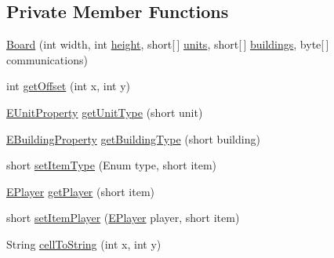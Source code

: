 \subsection*{Private Member Functions}
\begin{DoxyCompactItemize}
\item 
\mbox{\hyperlink{classgame_1_1board_1_1_board_ac76cd0bb1bdf47a810b87ebca19695ab}{Board}} (int width, int \mbox{\hyperlink{classgame_1_1board_1_1_board_aa8312858518138c1cc8af3dd0e823c4d}{height}}, short\mbox{[}$\,$\mbox{]} \mbox{\hyperlink{classgame_1_1board_1_1_board_a2c63c99ff5e82870b70d4b224520047e}{units}}, short\mbox{[}$\,$\mbox{]} \mbox{\hyperlink{classgame_1_1board_1_1_board_a80c3765beb7554e91aabbd09784f6632}{buildings}}, byte\mbox{[}$\,$\mbox{]} communications)
\item 
int \mbox{\hyperlink{classgame_1_1board_1_1_board_a786604a4b98251823436860ea00aec16}{get\+Offset}} (int x, int y)
\item 
\mbox{\hyperlink{enumrule_engine_1_1entity_1_1_e_unit_property}{E\+Unit\+Property}} \mbox{\hyperlink{classgame_1_1board_1_1_board_a23a469b1b268da78b39c584bc20bb4cd}{get\+Unit\+Type}} (short unit)
\item 
\mbox{\hyperlink{enumrule_engine_1_1entity_1_1_e_building_property}{E\+Building\+Property}} \mbox{\hyperlink{classgame_1_1board_1_1_board_aaa1ce124b88eb176e48081b54b0d689b}{get\+Building\+Type}} (short building)
\item 
short \mbox{\hyperlink{classgame_1_1board_1_1_board_a18c8b769344e85c3890e26c9b3f23e04}{set\+Item\+Type}} (Enum type, short item)
\item 
\mbox{\hyperlink{enumgame_1_1_e_player}{E\+Player}} \mbox{\hyperlink{classgame_1_1board_1_1_board_ae5b7778e3e77c51eb44064d3a4521d71}{get\+Player}} (short item)
\item 
short \mbox{\hyperlink{classgame_1_1board_1_1_board_abd6f8157a8e5f4e16a5e831c34a2e6d1}{set\+Item\+Player}} (\mbox{\hyperlink{enumgame_1_1_e_player}{E\+Player}} player, short item)
\item 
String \mbox{\hyperlink{classgame_1_1board_1_1_board_a5725709db18e36c737861fd396faa517}{cell\+To\+String}} (int x, int y)
\end{DoxyCompactItemize}
